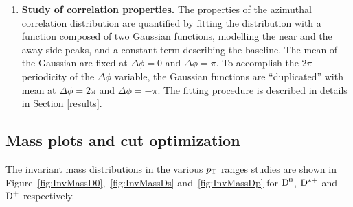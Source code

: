 \begin{enumerate}
\item
\underline{\bf Study of correlation properties.}
The properties of the azimuthal correlation distribution are quantified by
fitting the distribution with a function composed of two Gaussian functions, modelling the near and the away side peaks, and
a constant term describing the baseline. The mean of the Gaussian are fixed at
$\Delta\phi = 0$ and $\Delta\phi = \pi$. To accomplish the $2\pi$ periodicity
of the $\Delta\phi$ variable, the Gaussian functions
are ``duplicated'' with mean at $\Delta\phi = 2\pi$ and $\Delta\phi = -\pi$.
The fitting procedure is described in details in Section \ref{results}.



\end{enumerate}

\subsection{Mass plots and cut optimization}
The invariant mass distributions in the various $p_{\rm T}$ ranges studies are shown in Figure~\ref{fig:InvMassD0},~\ref{fig:InvMassDs} and~\ref{fig:InvMassDp} for ${\rm D^0}$, ${\rm D^{*+}}$ and ${\rm D^+}$ respectively.

